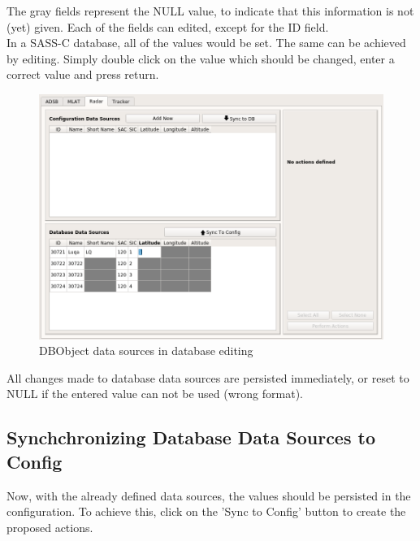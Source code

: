 The gray fields represent the NULL value, to indicate that this information is not (yet) given. Each of the fields can edited, except for the ID field. \\

In a SASS-C database, all of the values would be set. The same can be achieved by editing. Simply double click on the value which should be changed, enter a correct value and press return. \\

\begin{figure}[H]
  \center
    \includegraphics[width=16cm,frame]{../screenshots/manage_data_sources_edit_ds_db2.png}
  \caption{DBObject data sources in database editing}
\end{figure}

All changes made to database data sources are persisted immediately, or reset to NULL if the entered value can not be used (wrong format).

\subsection{Synchchronizing Database Data Sources to Config}

Now, with the already defined data sources, the values should be persisted in the configuration. To achieve this, click on the 'Sync to Config' button to create the proposed actions.

